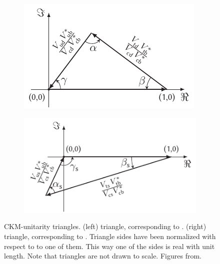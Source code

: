 \begin{figure}[h]
  \centering
  \begin{subfigure}{0.475\textwidth}
    \raggedright
    \includegraphics[width=\textwidth]{Figures/Chapter1/b-d-triangle}
    \caption{}
    \label{unitTriangles_bd}
  \end{subfigure}%
  \hfill%
  \begin{subfigure}{0.525\textwidth}
    \raggedleft
    \includegraphics[width=\textwidth]{Figures/Chapter1/b-s-triangle}
    \caption{}
    \label{unitTriangles_bs}
  \end{subfigure}
  \caption{CKM-unitarity triangles. (left) \Bd triangle, corresponding to . (right) \Bs triangle,
           corresponding to . Triangle sides have been normalized with respect to to one of them.
           This way one of the sides is real with unit length. Note that triangles are not drawn to scale. Figures from\cite{jeroenThesis}. }
  \label{unitTriangles}
\end{figure}

